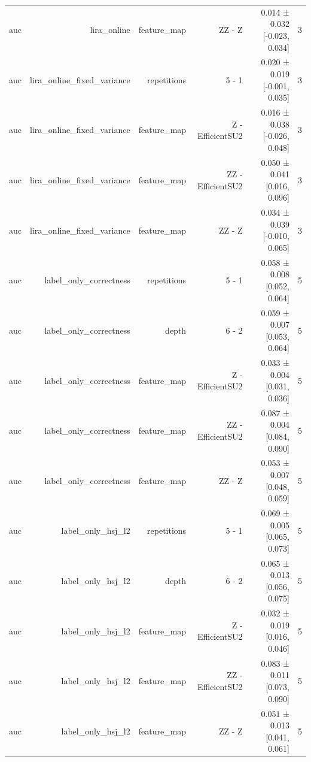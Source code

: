 \begin{table}
\begin{tabular}{lrrrrr}
auc & lira\_online & feature\_map & ZZ - Z & 0.014 ± 0.032 [-0.023, 0.034] & 3 \\
auc & lira\_online\_fixed\_variance & repetitions & 5 - 1 & 0.020 ± 0.019 [-0.001, 0.035] & 3 \\
auc & lira\_online\_fixed\_variance & feature\_map & Z - EfficientSU2 & 0.016 ± 0.038 [-0.026, 0.048] & 3 \\
auc & lira\_online\_fixed\_variance & feature\_map & ZZ - EfficientSU2 & 0.050 ± 0.041 [0.016, 0.096] & 3 \\
auc & lira\_online\_fixed\_variance & feature\_map & ZZ - Z & 0.034 ± 0.039 [-0.010, 0.065] & 3 \\
auc & label\_only\_correctness & repetitions & 5 - 1 & 0.058 ± 0.008 [0.052, 0.064] & 5 \\
auc & label\_only\_correctness & depth & 6 - 2 & 0.059 ± 0.007 [0.053, 0.064] & 5 \\
auc & label\_only\_correctness & feature\_map & Z - EfficientSU2 & 0.033 ± 0.004 [0.031, 0.036] & 5 \\
auc & label\_only\_correctness & feature\_map & ZZ - EfficientSU2 & 0.087 ± 0.004 [0.084, 0.090] & 5 \\
auc & label\_only\_correctness & feature\_map & ZZ - Z & 0.053 ± 0.007 [0.048, 0.059] & 5 \\
auc & label\_only\_hsj\_l2 & repetitions & 5 - 1 & 0.069 ± 0.005 [0.065, 0.073] & 5 \\
auc & label\_only\_hsj\_l2 & depth & 6 - 2 & 0.065 ± 0.013 [0.056, 0.075] & 5 \\
auc & label\_only\_hsj\_l2 & feature\_map & Z - EfficientSU2 & 0.032 ± 0.019 [0.016, 0.046] & 5 \\
auc & label\_only\_hsj\_l2 & feature\_map & ZZ - EfficientSU2 & 0.083 ± 0.011 [0.073, 0.090] & 5 \\
auc & label\_only\_hsj\_l2 & feature\_map & ZZ - Z & 0.051 ± 0.013 [0.041, 0.061] & 5 \\
\bottomrule
\end{tabular}
\end{table}


